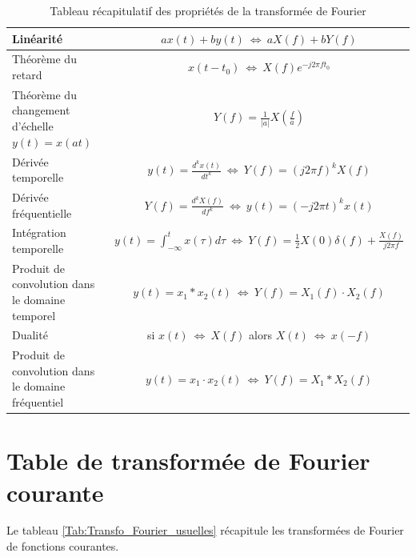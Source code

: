	\begin{table}[h!]
		\centering
		\caption{\label{Tab:Propriétés_Transfo_Fourier} Tableau récapitulatif des propriétés de la transformée de Fourier}
		\begin{tabular}{|l|c|}
			\hline
			Linéarité & $ax(t)+by(t)~\Leftrightarrow~aX(f)+bY(f)$ \\	
			\hline
			Théorème du retard & $x(t-t_0)~\Leftrightarrow~X(f)e^{-j2\pi f t_0}$ \\	
			\hline
			Théorème du changement d'échelle $y(t)=x(at)$ & $Y(f)=\frac{1}{|a|}X(\frac{f}{a})$ \\	
			\hline
			Dérivée temporelle & $y(t)=\frac{d^{k}x(t)}{dt^{k}}~\Leftrightarrow~Y(f)=(j2\pi f)^{k}X(f)$ \\
			\hline
			Dérivée fréquentielle & $Y(f)=\frac{d^{k}X(f)}{df^{k}}~\Leftrightarrow~y(t)=(-j2\pi t)^{k}x(t)$ \\
			\hline
			Intégration temporelle & $y(t)=\int_{-\infty}^{t}x(\tau)d\tau~\Leftrightarrow~Y(f)=\frac{1}{2}X(0)\delta(f)+\frac{X(f)}{j2\pi f}$ \\
			\hline
			Produit de convolution dans le domaine temporel & $y(t)=x_1*x_2 (t)~\Leftrightarrow~Y(f)=X_1(f)\cdot X_2(f)$ \\
			\hline
			Dualité & si $x(t)~\Leftrightarrow~X(f)$ alors $ X(t)~\Leftrightarrow~x(-f)$ \\
			\hline
			Produit de convolution dans le domaine fréquentiel & $y(t)=x_1 \cdot x_2 (t)~\Leftrightarrow~Y(f)=X_1* X_2(f)$ \\
			\hline
		\end{tabular}	
	\end{table}
	
	\section{Table de transformée de Fourier courante}
	Le tableau \ref{Tab:Transfo_Fourier_usuelles} récapitule les transformées de Fourier de fonctions courantes.
	
